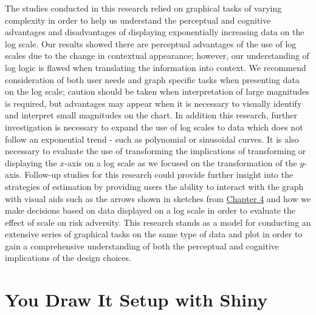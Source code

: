 \documentclass[print]{nuthesis}
\begin{document}
The studies conducted in this research relied on graphical tasks of varying complexity in order to help us understand the perceptual and cognitive advantages and disadvantages of displaying exponentially increasing data on the log scale.
Our results showed there are perceptual advantages of the use of log scales due to the change in contextual appearance; however, our understanding of log logic is flawed when translating the information into context.
We recommend consideration of both user needs and graph specific tasks when presenting data on the log scale; caution should be taken when interpretation of large magnitudes is required, but advantages may appear when it is necessary to visually identify and interpret small magnitudes on the chart.
In addition this research, further investigation is necessary to expand the use of log scales to data which does not follow an exponential trend - such as polynomial or sinusoidal curves.
It is also necessary to evaluate the use of transforming the implications of transforming or displaying the \(x\)-axis on a log scale as we focused on the transformation of the \(y\)-axis.
Follow-up studies for this research could provide further insight into the strategies of estimation by providing users the ability to interact with the graph with visual aids such as the arrows shown in sketches from \protect\hyperlink{estimation}{Chapter 4} and how we make decisions based on data displayed on a log scale in order to evaluate the effect of scale on risk adversity.
This research stands as a model for conducting an extensive series of graphical tasks on the same type of data and plot in order to gain a comprehensive understanding of both the perceptual and cognitive implications of the design choices.

\appendix

\hypertarget{youdrawit-with-shiny}{%
\chapter{You Draw It Setup with Shiny}\label{youdrawit-with-shiny}}
\end{document}
